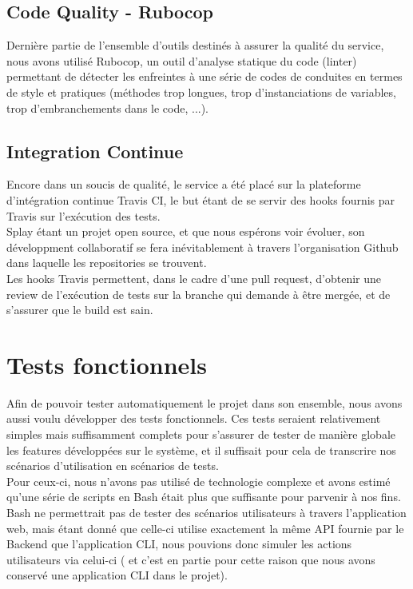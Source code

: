 \documentclass{eplmastersthesis}
\begin{document}
      \subsection{Code Quality - Rubocop}

        Dernière partie de l'ensemble d'outils destinés à assurer la qualité du
        service, nous avons utilisé Rubocop, un outil d'analyse statique du code
        (linter) permettant de détecter les enfreintes à une série de codes
        de conduites en termes de style et pratiques (méthodes trop longues,
        trop d'instanciations de variables, trop d'embranchements dans le code, ...).

      \subsection{Integration Continue}

        Encore dans un soucis de qualité, le service a été placé sur la plateforme
        d'intégration continue Travis CI, le but étant de se servir des hooks
        fournis par Travis sur l'exécution des tests.\\

        Splay étant un projet open source, et que nous espérons voir évoluer, son
        développment collaboratif se fera inévitablement à travers l'organisation
        Github dans laquelle les repositories se trouvent.\\
        Les hooks Travis permettent, dans le cadre d'une pull request, d'obtenir
        une review de l'exécution de tests sur la branche qui demande à être
        mergée, et de s'assurer que le build est sain.

    \section{Tests fonctionnels}

      Afin de pouvoir tester automatiquement le projet dans son ensemble, nous
      avons aussi voulu développer des tests fonctionnels. Ces tests seraient
      relativement simples mais suffisamment complets pour s'assurer de
      tester de manière globale les features développées sur le système, et
      il suffisait pour cela de transcrire nos scénarios d'utilisation en
      scénarios de tests.\\

      Pour ceux-ci, nous n'avons pas utilisé de technologie complexe et avons
      estimé qu'une série de scripts en Bash était plus que suffisante pour
      parvenir à nos fins. Bash ne permettrait pas de tester des scénarios
      utilisateurs à travers l'application web, mais étant donné que celle-ci
      utilise exactement la même API fournie par le Backend que l'application
      CLI, nous pouvions donc simuler les actions utilisateurs via celui-ci (
      et c'est en partie pour cette raison que nous avons conservé une
      application CLI dans le projet).\\
\end{document}
